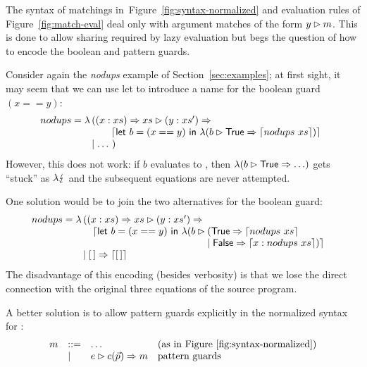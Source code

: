 The syntax of matchings in~Figure~\ref{fig:syntax-normalized} and
evaluation rules of Figure~\ref{fig:match-eval} deal only with
argument matches of the form $y\rhd m$.  This is done to
allow sharing required by lazy evaluation but begs the question
of how to encode the boolean and pattern guards. 

Consider again the \textit{nodups} example of
Section~\ref{sec:examples}; at first sight, it may seem that we can
use let to introduce a name for the boolean guard $(x==y)$:
\[
  nodups = \lambda \!\!\begin{array}[t]{l}
    ((x:xs) \Rightarrow xs \rhd (y:xs') \Rightarrow \\
     \qquad \left\lceil \textsf{let}~ b = (x==y)~ \textsf{in}~
             \lambda(b \rhd \textsf{True} \Rightarrow \left\lceil nodups~ xs\right\rceil)\right\rceil  \\
                         \mid \ldots~)
                       \end{array}
\]
However, this does not work: if $b$ evaluates to ,
then $\lambda(b \rhd \textsf{True} \Rightarrow \ldots)$ gets ``stuck''
as $\lambda \lightning$ and the subsequent equations are never attempted.

One solution would be to join the two alternatives for the boolean guard:
\[
  nodups = \lambda \!\!\begin{array}[t]{l}
    ((x:xs) \Rightarrow xs \rhd (y:xs') \Rightarrow \\
     \quad \lceil\textsf{let}~ b = (x==y)~ \textsf{in}~
                         \lambda(b \rhd \!\!\!\begin{array}[t]{l}
                                                (\textsf{True} \Rightarrow \left\lceil nodups~ xs\right\rceil \\
                                                \mid \textsf{False} \Rightarrow \left\lceil x:nodups ~ xs\right\rceil)\rceil\end{array}  \\
                         \mid [\,] \Rightarrow \left\lceil [\,]\right\rceil
                       \end{array}
\]
The disadvantage of this encoding (besides verbosity) is that we lose
the direct connection with the original three equations of the source
program.

A better solution is to allow pattern guards explicitly in the
normalized syntax for \lambdaPMC:
\[
  \begin{array}{llll}
  m &::=& \ldots & \text{(as in Figure~\ref{fig:syntax-normalized})} \\
    & | & e\rhd c(\vec{p}) \Rightarrow m & \text{pattern guards}
                                                            \end {array}
\]

